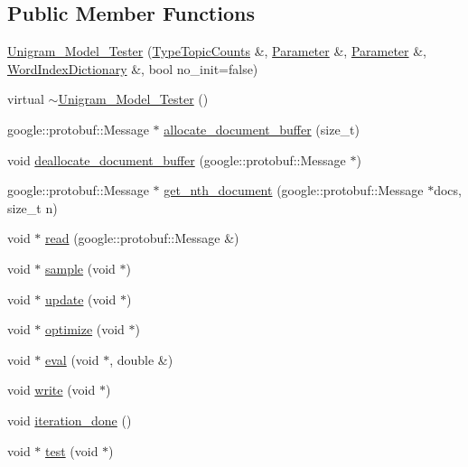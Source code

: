 \subsection*{Public Member Functions}
\begin{DoxyCompactItemize}
\item 
\hyperlink{class_unigram___model___tester_af48089157061db407a1818403884a0a9}{Unigram\_\-Model\_\-Tester} (\hyperlink{class_type_topic_counts}{TypeTopicCounts} \&, \hyperlink{struct_parameter}{Parameter} \&, \hyperlink{struct_parameter}{Parameter} \&, \hyperlink{class_word_index_dictionary}{WordIndexDictionary} \&, bool no\_\-init=false)
\item 
virtual \hyperlink{class_unigram___model___tester_adb5becca4680bbc5caf22ac50f1f6d11}{$\sim$Unigram\_\-Model\_\-Tester} ()
\item 
google::protobuf::Message $\ast$ \hyperlink{class_unigram___model___tester_a81877bb24ead9124407d32109a83acba}{allocate\_\-document\_\-buffer} (size\_\-t)
\item 
void \hyperlink{class_unigram___model___tester_a239d3ab22007a073927dcd80501e6579}{deallocate\_\-document\_\-buffer} (google::protobuf::Message $\ast$)
\item 
google::protobuf::Message $\ast$ \hyperlink{class_unigram___model___tester_a0062dadca66fc40748590b4aa721a291}{get\_\-nth\_\-document} (google::protobuf::Message $\ast$docs, size\_\-t n)
\item 
void $\ast$ \hyperlink{class_unigram___model___tester_a3d6b3c06e90df22b72bbd979eedef78e}{read} (google::protobuf::Message \&)
\item 
void $\ast$ \hyperlink{class_unigram___model___tester_a81e1571fb84f36e059d8e68e01ab91f1}{sample} (void $\ast$)
\item 
void $\ast$ \hyperlink{class_unigram___model___tester_a067e8f0f15ce9c48eef77d22978eaceb}{update} (void $\ast$)
\item 
void $\ast$ \hyperlink{class_unigram___model___tester_a1f1c50061c974325ec32810e27428d08}{optimize} (void $\ast$)
\item 
void $\ast$ \hyperlink{class_unigram___model___tester_afb32ae60aac5863d0f8ac50af4fd9ff2}{eval} (void $\ast$, double \&)
\item 
void \hyperlink{class_unigram___model___tester_a9f9538866008fd7dfd681faaf4562b74}{write} (void $\ast$)
\item 
void \hyperlink{class_unigram___model___tester_a04021ed578bfeaa08a8956fc611c2722}{iteration\_\-done} ()
\item 
void $\ast$ \hyperlink{class_unigram___model___tester_ab006fec2130a391827c117a126b00d09}{test} (void $\ast$)
\end{DoxyCompactItemize}
